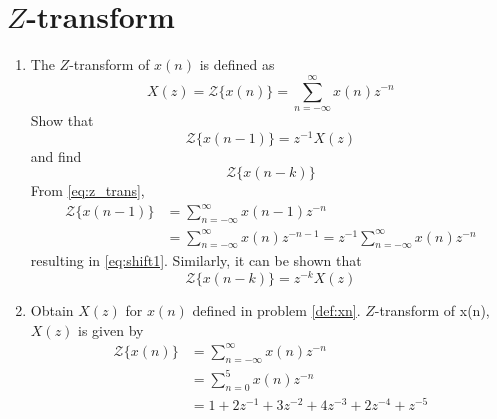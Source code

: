 \documentclass[journal,12pt,twocolumn]{IEEEtran}
\renewcommand\thesection{\arabic{section}}
\begin{document}
\section{$Z$-transform}
\begin{enumerate}[label=\thesection.\arabic*]
\item The $Z$-transform of $x(n)$ is defined as
%
\begin{equation}
\label{eq:z_trans}
X(z)={\mathcal {Z}}\{x(n)\}=\sum _{n=-\infty }^{\infty }x(n)z^{-n}
\end{equation}
%
Show that
\begin{equation}
\label{eq:shift1}
{\mathcal {Z}}\{x(n-1)\} = z^{-1}X(z)
\end{equation}
and find
\begin{equation}
	{\mathcal {Z}}\{x(n-k)\} 
\end{equation}
\solution From \eqref{eq:z_trans},
\begin{align}
{\mathcal {Z}}\{x(n-1)\} &=\sum _{n=-\infty }^{\infty }x(n-1)z^{-n}
\\
&=\sum _{n=-\infty }^{\infty }x(n)z^{-n-1} = z^{-1}\sum _{n=-\infty }^{\infty }x(n)z^{-n}
\end{align}
resulting in \eqref{eq:shift1}. Similarly, it can be shown that
%
\begin{equation}
\label{eq:z_trans_shift}
	{\mathcal {Z}}\{x(n-k)\} = z^{-k}X(z)
\end{equation}



\item Obtain $X(z)$ for $x(n)$ defined in problem 
\ref{def:xn}.
\solution $Z$-transform of x(n),$X(z)$ is given by
\begin{align}
	\mathcal{Z}\{x(n)\}&=\sum_{n=-\infty}^\infty x(n)z^{-n}\\
	&=\sum_{n=0}^5x(n)z^{-n}\\
	&=1+2z^{-1}+3z^{-2}+4z^{-3}+2z^{-4}+z^{-5}
\end{align}


%
%
%






\end{enumerate}
\end{document}
